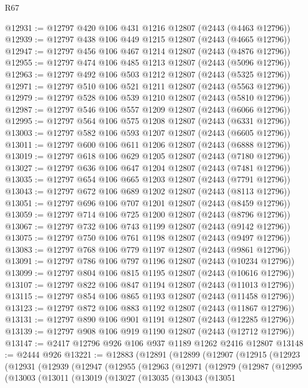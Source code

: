 \begin{lexlean}{R67}
\begin{coremodule}
@12931 := @12797 @420 @106 @431 @1216 @12807 (@2443 (@4463 @12796))
@12939 := @12797 @438 @106 @449 @1215 @12807 (@2443 (@4665 @12796))
@12947 := @12797 @456 @106 @467 @1214 @12807 (@2443 (@4876 @12796))
@12955 := @12797 @474 @106 @485 @1213 @12807 (@2443 (@5096 @12796))
@12963 := @12797 @492 @106 @503 @1212 @12807 (@2443 (@5325 @12796))
@12971 := @12797 @510 @106 @521 @1211 @12807 (@2443 (@5563 @12796))
@12979 := @12797 @528 @106 @539 @1210 @12807 (@2443 (@5810 @12796))
@12987 := @12797 @546 @106 @557 @1209 @12807 (@2443 (@6066 @12796))
@12995 := @12797 @564 @106 @575 @1208 @12807 (@2443 (@6331 @12796))
@13003 := @12797 @582 @106 @593 @1207 @12807 (@2443 (@6605 @12796))
@13011 := @12797 @600 @106 @611 @1206 @12807 (@2443 (@6888 @12796))
@13019 := @12797 @618 @106 @629 @1205 @12807 (@2443 (@7180 @12796))
@13027 := @12797 @636 @106 @647 @1204 @12807 (@2443 (@7481 @12796))
@13035 := @12797 @654 @106 @665 @1203 @12807 (@2443 (@7791 @12796))
@13043 := @12797 @672 @106 @689 @1202 @12807 (@2443 (@8113 @12796))
@13051 := @12797 @696 @106 @707 @1201 @12807 (@2443 (@8459 @12796))
@13059 := @12797 @714 @106 @725 @1200 @12807 (@2443 (@8796 @12796))
@13067 := @12797 @732 @106 @743 @1199 @12807 (@2443 (@9142 @12796))
@13075 := @12797 @750 @106 @761 @1198 @12807 (@2443 (@9497 @12796))
@13083 := @12797 @768 @106 @779 @1197 @12807 (@2443 (@9861 @12796))
@13091 := @12797 @786 @106 @797 @1196 @12807 (@2443 (@10234 @12796))
@13099 := @12797 @804 @106 @815 @1195 @12807 (@2443 (@10616 @12796))
@13107 := @12797 @822 @106 @847 @1194 @12807 (@2443 (@11013 @12796))
@13115 := @12797 @854 @106 @865 @1193 @12807 (@2443 (@11458 @12796))
@13123 := @12797 @872 @106 @883 @1192 @12807 (@2443 (@11867 @12796))
@13131 := @12797 @890 @106 @901 @1191 @12807 (@2443 (@12285 @12796))
@13139 := @12797 @908 @106 @919 @1190 @12807 (@2443 (@12712 @12796))
@13147 := @2417 @12796 @926 @106 @937 @1189 @1262 @2416 @12807
@13148 := @2444 @926
@13221 := @12883
    (@12891
      (@12899
        (@12907
          (@12915
            (@12923
              (@12931
                (@12939
                  (@12947
                    (@12955
                      (@12963
                        (@12971
                          (@12979
                            (@12987
                              (@12995
                                (@13003
                                  (@13011
                                    (@13019
                                      (@13027
                                        (@13035
                                          (@13043
                                            (@13051

\end{coremodule}
\end{lexlean}
